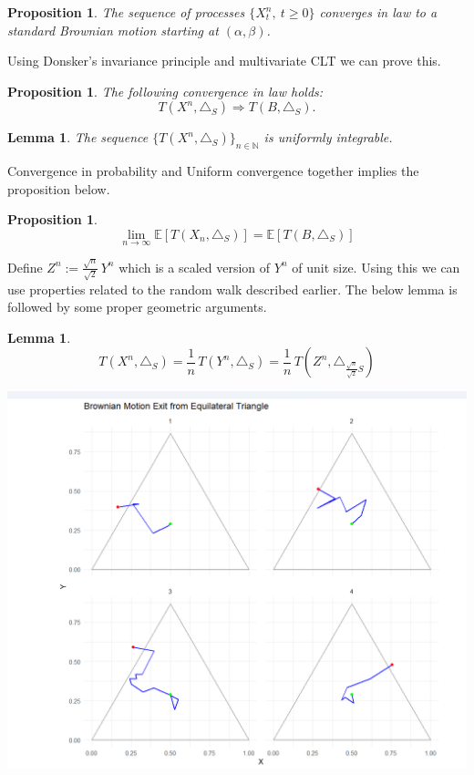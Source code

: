 \documentclass[a0,portrait]{a0poster}
\newtheorem{proposition}[theorem]{Proposition}
\newtheorem{lemma}[theorem]{Lemma}
\begin{document}
\begin{mdframed}[style=MyFrame]
\begin{multicols}{2}
\begin{proposition}\label{process-convergence}\cite{MR2023644}
The sequence of processes \( \{X^n_t, \ t \geq 0\} \) converges in law to a standard Brownian motion starting at \( (\alpha, \beta) \).
\end{proposition}
\noindent Using Donsker's invariance principle\cite{PeresMortersBook} and multivariate CLT we can prove this.
\begin{proposition}\label{exit-time-convergence}\cite{MR2023644}
The following convergence in law holds:  
\[
T(X^n, \triangle_S) \Rightarrow T(B, \triangle_S).
\]
\end{proposition}
\begin{lemma}\cite{MR2023644}
The sequence \( \{T(X^n, \triangle_S)\}_{n \in \mathbb{N}} \) is uniformly integrable.
\end{lemma}
\noindent Convergence in probability and Uniform convergence together implies the proposition below.
\begin{proposition}\cite{MR2023644}
\[
\lim_{n \to \infty} \mathbb{E}\left[T(X_n, \triangle_S)\right] = \mathbb{E}\left[T(B, \triangle_S)\right]
\]
\end{proposition}
\noindent Define \(Z^n:= \frac{\sqrt{n}}{\sqrt{2}} \, Y^n\) which is a scaled version of \(Y^n\) of unit size. Using this we can use properties related to the random walk described earlier. The below lemma is followed by some proper geometric arguments.
\begin{lemma}\cite{MR2023644}
\[
T(X^n, \triangle_S) = \frac{1}{n} \, T(Y^n, \triangle_S) = \frac{1}{n} \, T\left(Z^n,\triangle_{ \frac{\sqrt{n}}{\sqrt2}S}\right)
\]

\end{lemma}
%
\vspace{1cm}
\begin{minipage}{\columnwidth}
    \includegraphics[width=0.7\columnwidth]{Screenshot 2025-07-05 141656.png}
    

\end{minipage}
\end{multicols}
\end{mdframed}
\end{document}
